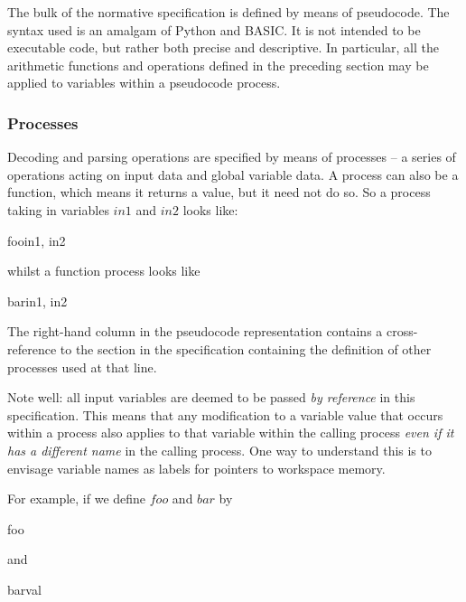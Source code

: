 The bulk of the normative specification is defined by means of pseudocode. 
The syntax used is an amalgam of Python and BASIC. It is not intended
to be executable code, but rather both precise and descriptive. 
In particular, all the arithmetic functions and
operations defined in the preceding section may be applied to variables within
a pseudocode process.

\subsubsection{Processes}
\label{functionsprocesses}

Decoding and parsing operations are specified by means of processes
 -- a series of operations acting on input data and global variable data. 
A process can also be a function, which means it returns a value, but
it need not do so. So a process
taking in variables $in1$ and $in2$ looks like:

\begin{pseudo}{foo}{in1, in2}
\bsCODE{\hdots}
\end{pseudo}

whilst a function process looks like

\begin{pseudo}{bar}{in1, in2}
\bsCODE{\hdots}
\end{pseudo}

The right-hand column in the pseudocode representation contains a cross-reference to the 
section in the specification containing the definition of other processes used at that line.

Note well: all input variables are deemed to be passed {\em by reference} in this
specification. This means that any modification to a variable value that
occurs within a process also applies to that variable within the calling process
{\em even if it has a different name} in the calling process. One way to understand
this is to envisage variable names as labels for pointers to workspace memory.

For example, if we define $foo$ and $bar$ by

\begin{pseudo}{foo}{}
\end{pseudo}

and 

\begin{pseudo}{bar}{val}
\end{pseudo}

